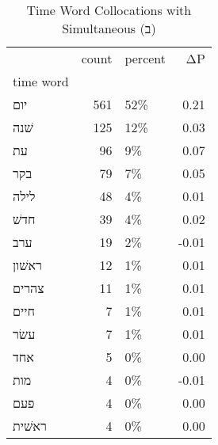 \begin{table}[htbp!]
\centering
\caption{Time Word Collocations with Simultaneous (ב)}
\label{table:simב_head_cpd}
\begin{tabular}{lrlr}
\toprule
{} &  count & percent &    ΔP \\
time word &        &         &       \\
\midrule
יום       &    561 &     52\% &  0.21 \\
שׁנה      &    125 &     12\% &  0.03 \\
עת        &     96 &      9\% &  0.07 \\
בקר       &     79 &      7\% &  0.05 \\
לילה      &     48 &      4\% &  0.01 \\
חדשׁ      &     39 &      4\% &  0.02 \\
ערב       &     19 &      2\% & -0.01 \\
ראשׁון    &     12 &      1\% &  0.01 \\
צהרים     &     11 &      1\% &  0.01 \\
חיים      &      7 &      1\% &  0.01 \\
עשׂר      &      7 &      1\% &  0.01 \\
אחד       &      5 &      0\% &  0.00 \\
מות       &      4 &      0\% & -0.01 \\
פעם       &      4 &      0\% &  0.00 \\
ראשׁית    &      4 &      0\% &  0.00 \\
\bottomrule
\end{tabular}
\end{table}
